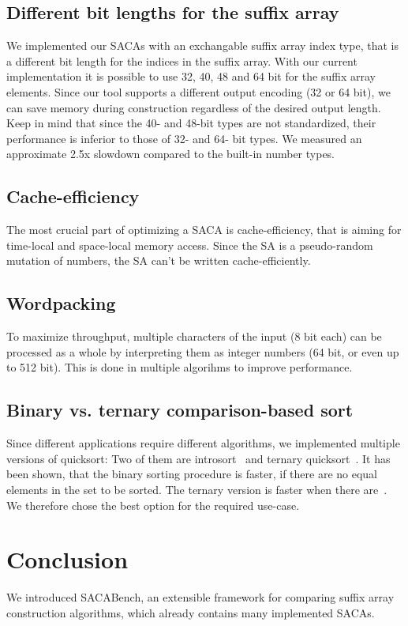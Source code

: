 \subsection{Different bit lengths for the suffix array}

We implemented our SACAs with an exchangable suffix array index type, that is a different bit length for the indices in the suffix array.
With our current implementation it is possible to use 32, 40, 48 and 64 bit for the suffix array elements.
Since our tool supports a different output encoding (32 or 64 bit), we can save memory during construction regardless of the desired output length.
Keep in mind that since the 40- and 48-bit types are not standardized, their performance is inferior to those of 32- and 64- bit types.
We measured an approximate 2.5x slowdown compared to the built-in number types.

\subsection{Cache-efficiency}

The most crucial part of optimizing a SACA is cache-efficiency, that is aiming for time-local and space-local memory access.
Since the SA is a pseudo-random mutation of numbers, the SA can't be written cache-efficiently.

\subsection{Wordpacking}

To maximize throughput, multiple characters of the input (8 bit each) can be processed as a whole by interpreting them as integer numbers (64 bit, or even up to 512 bit).
This is done in multiple algorihms to improve performance.

\subsection{Binary vs. ternary comparison-based sort}

Since different applications require different algorithms, we implemented multiple versions of quicksort:
Two of them are introsort~\cite{Musser97} and ternary quicksort~\cite{ternary_quicksort}.
It has been shown, that the binary sorting procedure is faster, if there are no equal elements in the set to be sorted.
The ternary version is faster when there are~\cite{ternary_quicksort}.
We therefore chose the best option for the required use-case.

\section{Conclusion}

We introduced SACABench, an extensible framework for comparing suffix array construction algorithms,
which already contains many implemented SACAs.


\blindtext

\blindtext

